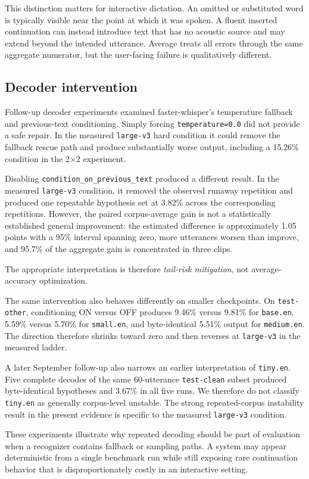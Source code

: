 This distinction matters for interactive dictation. An omitted or substituted word is typically
visible near the point at which it was spoken. A fluent inserted continuation can instead
introduce text that has no acoustic source and may extend beyond the intended utterance. Average
\wer{} treats all errors through the same aggregate numerator, but the user-facing failure is
qualitatively different.

\subsection{Decoder intervention}

Follow-up decoder experiments examined faster-whisper's temperature fallback and previous-text
conditioning. Simply forcing \texttt{temperature=0.0} did not provide a safe repair. In the
measured \texttt{large-v3} hard condition it could remove the fallback rescue path and produce
substantially worse output, including a 15.26\% \wer{} condition in the 2$\times$2 experiment.

Disabling \texttt{condition\_on\_previous\_text} produced a different result. In the measured
\texttt{large-v3} condition, it removed the observed runaway repetition and produced one
repeatable hypothesis set at 3.82\% \wer{} across the corresponding repetitions. However, the
paired corpus-average gain is not a statistically established general \wer{} improvement: the
estimated difference is approximately 1.05 \wer{} points with a 95\% interval spanning zero,
more utterances worsen than improve, and 95.7\% of the aggregate gain is concentrated in three
clips.

The appropriate interpretation is therefore \emph{tail-risk mitigation}, not average-accuracy
optimization.

The same intervention also behaves differently on smaller checkpoints. On
\texttt{test-other}, conditioning ON versus OFF produces 9.46\% versus 9.81\% for
\texttt{base.en}, 5.59\% versus 5.70\% for \texttt{small.en}, and byte-identical 5.51\%
output for \texttt{medium.en}. The direction therefore shrinks toward zero and then reverses at
\texttt{large-v3} in the measured ladder.

A later September follow-up also narrows an earlier interpretation of \texttt{tiny.en}. Five
complete decodes of the same 60-utterance \texttt{test-clean} subset produced byte-identical
hypotheses and 3.67\% \wer{} in all five runs. We therefore do not classify \texttt{tiny.en} as
generally corpus-level unstable. The strong repeated-corpus instability result in the present
evidence is specific to the measured \texttt{large-v3} condition.

These experiments illustrate why repeated decoding should be part of evaluation when a recognizer
contains fallback or sampling paths. A system may appear deterministic from a single benchmark
run while still exposing rare continuation behavior that is disproportionately costly in an
interactive setting.